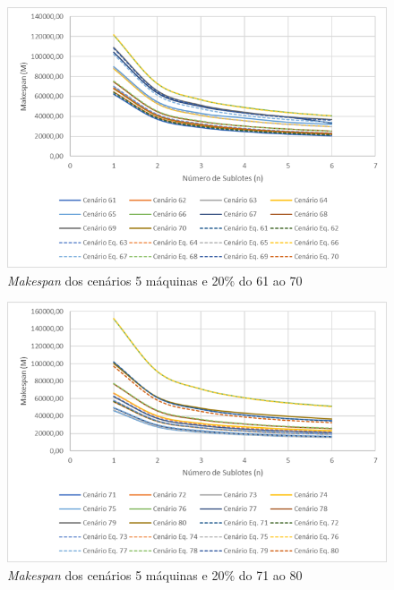 \begin{figure}[H]
    \centering
    \includegraphics[width=13cm]{Apendices/Figuras/05m20_61-70}
    \caption{\textit{Makespan} dos cenários 5 máquinas e 20\% do 61 ao 70}
    \label{fig:05m20_61-70}
\end{figure}

\begin{figure}[H]
    \centering
    \includegraphics[width=13cm]{Apendices/Figuras/05m20_71-80}
    \caption{\textit{Makespan} dos cenários 5 máquinas e 20\% do 71 ao 80}
    \label{fig:05m20_71-80}
\end{figure}

